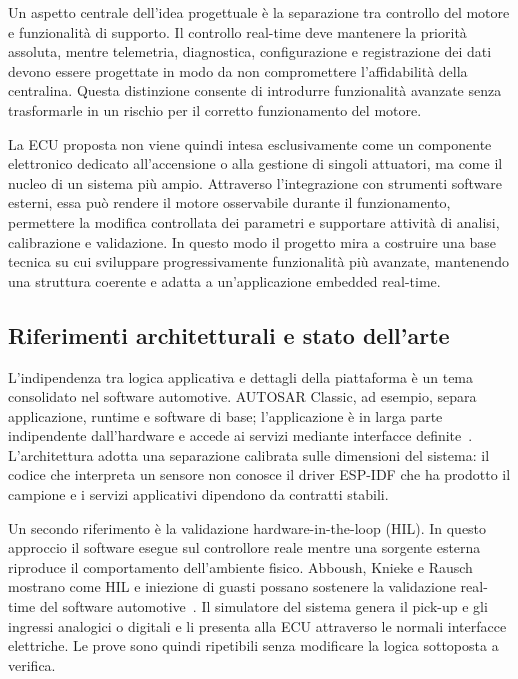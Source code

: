 \documentclass{article}
\begin{document}
Un aspetto centrale dell'idea progettuale è la separazione tra controllo del motore e funzionalità di supporto. Il controllo real-time deve mantenere la priorità assoluta, mentre telemetria, diagnostica, configurazione e registrazione dei dati devono essere progettate in modo da non compromettere l'affidabilità della centralina. Questa distinzione consente di introdurre funzionalità avanzate senza trasformarle in un rischio per il corretto funzionamento del motore.

La ECU proposta non viene quindi intesa esclusivamente come un componente elettronico dedicato all'accensione o alla gestione di singoli attuatori, ma come il nucleo di un sistema più ampio. Attraverso l'integrazione con strumenti software esterni, essa può rendere il motore osservabile durante il funzionamento, permettere la modifica controllata dei parametri e supportare attività di analisi, calibrazione e validazione. In questo modo il progetto mira a costruire una base tecnica su cui sviluppare progressivamente funzionalità più avanzate, mantenendo una struttura coerente e adatta a un'applicazione embedded real-time.

\subsection{Riferimenti architetturali e stato dell'arte}

L'indipendenza tra logica applicativa e dettagli della piattaforma è un tema
consolidato nel software automotive. AUTOSAR Classic, ad esempio, separa
applicazione, runtime e software di base; l'applicazione è in larga parte
indipendente dall'hardware e accede ai servizi mediante interfacce
definite~\cite{autosar_classic}. L'architettura adotta una separazione calibrata
sulle dimensioni del sistema: il codice che interpreta un sensore non conosce
il driver ESP-IDF che ha prodotto il campione e i servizi applicativi dipendono
da contratti stabili.

Un secondo riferimento è la validazione hardware-in-the-loop (HIL). In questo
approccio il software esegue sul controllore reale mentre una sorgente esterna
riproduce il comportamento dell'ambiente fisico. Abboush, Knieke e Rausch
mostrano come HIL e iniezione di guasti possano sostenere la validazione real-time
del software automotive~\cite{abboush_hil}. Il simulatore del sistema genera il
pick-up e gli ingressi analogici o digitali e li presenta alla ECU attraverso
le normali interfacce elettriche. Le prove sono quindi ripetibili senza
modificare la logica sottoposta a verifica.
\end{document}
